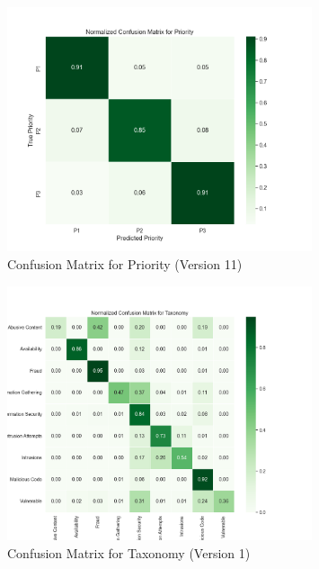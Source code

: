 \begin{figure}[b!]
    \centering
    \includegraphics[width=0.8\textwidth]{ch4/assets/v11_confusion_priority.png}
    \caption{Confusion Matrix for Priority (Version 11)}
    \label{fig:confusion_priority_v11}
\end{figure}

\begin{figure}[t!]
    \centering
    \includegraphics[width=0.8\textwidth]{ch4/assets/v1_confusion_taxonomy.png}
    \caption{Confusion Matrix for Taxonomy (Version 1)}
    \label{fig:confusion_taxonomy_v1}
\end{figure}

